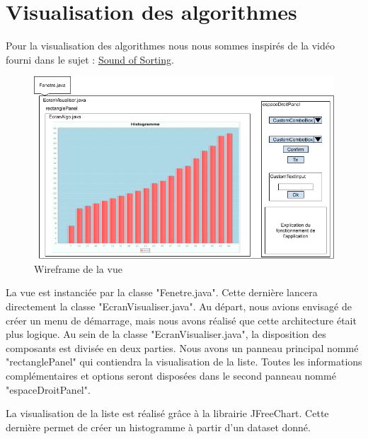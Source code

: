 \documentclass[a4paper,12pt]{article}
\begin{document}
\section{Visualisation des algorithmes}
Pour la visualisation des algorithmes nous nous sommes inspirés de la vidéo fourni dans le sujet : \href{https://www.youtube.com/watch?v=kPRA0W1kECg}{Sound of Sorting}. 
\begin{figure}[h]
    \centering
    \includegraphics[width=\textwidth]{umlview.png}
    \caption{Wireframe de la vue }
    \label{fig:enter-label}
\end{figure}
\newline
La vue est instanciée par la classe "Fenetre.java". Cette dernière lancera directement la classe "EcranVisualiser.java". Au départ, nous avions envisagé de créer un menu de démarrage, mais nous avons réalisé que cette architecture était plus logique. 
\vspace{0.5cm}
\newline
Au sein de la classe "EcranVisualiser.java", la disposition des composants est divisée en deux parties. Nous avons un panneau principal nommé "rectanglePanel" qui contiendra la visualisation de la liste. Toutes les informations complémentaires et options seront disposées dans le second panneau nommé "espaceDroitPanel".

La visualisation de la liste est réalisé grâce à la librairie JFreeChart. Cette dernière permet de créer un histogramme à partir d'un dataset donné. 
\end{document}

